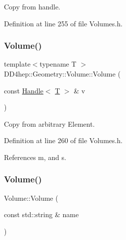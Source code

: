 Copy from handle. 



Definition at line 255 of file Volumes.\+h.

\hypertarget{class_d_d4hep_1_1_geometry_1_1_volume_a0deff8e4df9fd73e7fc0083f068a931d}{}\label{class_d_d4hep_1_1_geometry_1_1_volume_a0deff8e4df9fd73e7fc0083f068a931d} 
\subsubsection{\texorpdfstring{Volume()}{Volume()}\hspace{0.1cm}{\footnotesize\ttfamily [4/6]}}
{\footnotesize\ttfamily template$<$typename T $>$ \\
D\+D4hep\+::\+Geometry\+::\+Volume\+::\+Volume (\begin{DoxyParamCaption}\item[{const \hyperlink{class_d_d4hep_1_1_handle}{Handle}$<$ \hyperlink{class_t}{T} $>$ \&}]{v }\end{DoxyParamCaption})\hspace{0.3cm}{\ttfamily [inline]}}



Copy from arbitrary Element. 



Definition at line 260 of file Volumes.\+h.



References m, and s.

\hypertarget{class_d_d4hep_1_1_geometry_1_1_volume_a2f7cd845fb0afa8894f7578293c0312e}{}\label{class_d_d4hep_1_1_geometry_1_1_volume_a2f7cd845fb0afa8894f7578293c0312e} 
\subsubsection{\texorpdfstring{Volume()}{Volume()}\hspace{0.1cm}{\footnotesize\ttfamily [5/6]}}
{\footnotesize\ttfamily Volume\+::\+Volume (\begin{DoxyParamCaption}\item[{const std\+::string \&}]{name }\end{DoxyParamCaption})}



